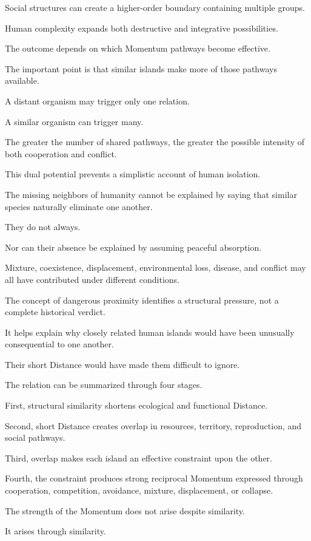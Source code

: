 Social structures can create a higher-order boundary containing multiple groups.

Human complexity expands both destructive and integrative possibilities.

The outcome depends on which Momentum pathways become effective.

The important point is that similar islands make more of those pathways available.

A distant organism may trigger only one relation.

A similar organism can trigger many.

The greater the number of shared pathways, the greater the possible intensity of both cooperation and conflict.

This dual potential prevents a simplistic account of human isolation.

The missing neighbors of humanity cannot be explained by saying that similar species naturally eliminate one another.

They do not always.

Nor can their absence be explained by assuming peaceful absorption.

Mixture, coexistence, displacement, environmental loss, disease, and conflict may all have contributed under different conditions.

The concept of dangerous proximity identifies a structural pressure, not a complete historical verdict.

It helps explain why closely related human islands would have been unusually consequential to one another.

Their short Distance would have made them difficult to ignore.

The relation can be summarized through four stages.

First, structural similarity shortens ecological and functional Distance.

Second, short Distance creates overlap in resources, territory, reproduction, and social pathways.

Third, overlap makes each island an effective constraint upon the other.

Fourth, the constraint produces strong reciprocal Momentum expressed through cooperation, competition, avoidance, mixture, displacement, or collapse.

The strength of the Momentum does not arise despite similarity.

It arises through similarity.

